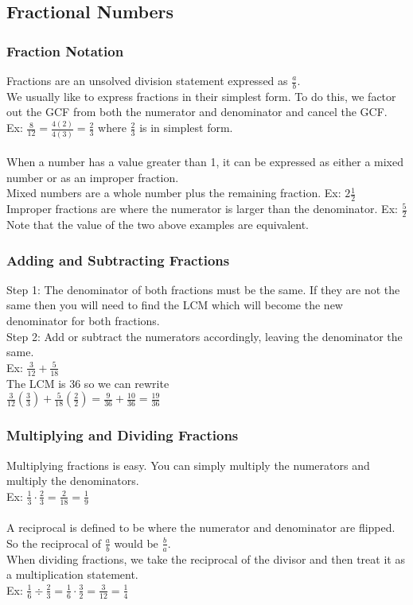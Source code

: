 \subsection{Fractional Numbers}

\subsubsection{Fraction Notation}
Fractions are an unsolved division statement expressed as $\frac{a}{b}$.\\
We usually like to express fractions in their simplest form. To do this, we factor out the GCF from both the numerator and denominator and cancel the GCF.\\
Ex: $\frac{8}{12}=\frac{4(2)}{4(3)}=\frac{2}{3}$ where $\frac{2}{3}$ is in simplest form.\\
\\
When a number has a value greater than 1, it can be expressed as either a mixed number or as an improper fraction.\\
Mixed numbers are a whole number plus the remaining fraction. Ex: $2\frac{1}{2}$\\
Improper fractions are where the numerator is larger than the denominator. Ex: $\frac{5}{2}$\\
Note that the value of the two above examples are equivalent.\\

\subsubsection{Adding and Subtracting Fractions}
Step 1: The denominator of both fractions must be the same. If they are not the same then you will need to find the LCM which will become the new denominator for both fractions.\\
Step 2: Add or subtract the numerators accordingly, leaving the denominator the same.\\
Ex: $\frac{3}{12}+\frac{5}{18}$\\
The LCM is 36 so we can rewrite\\
$\frac{3}{12}\left(\frac{3}{3}\right)+\frac{5}{18}\left(\frac{2}{2}\right)=\frac{9}{36}+\frac{10}{36}=\frac{19}{36}$\\

\subsubsection{Multiplying and Dividing Fractions}
Multiplying fractions is easy. You can simply multiply the numerators and multiply the denominators.\\
Ex: $\frac{1}{3}\cdot\frac{2}{3}=\frac{2}{18}=\frac{1}{9}$\\
\\
A reciprocal is defined to be where the numerator and denominator are flipped. So the reciprocal of $\frac{a}{b}$ would be $\frac{b}{a}$.\\
When dividing fractions, we take the reciprocal of the divisor and then treat it as a multiplication statement.\\
Ex: $\frac{1}{6}\div\frac{2}{3}=\frac{1}{6}\cdot\frac{3}{2}=\frac{3}{12}=\frac{1}{4}$

